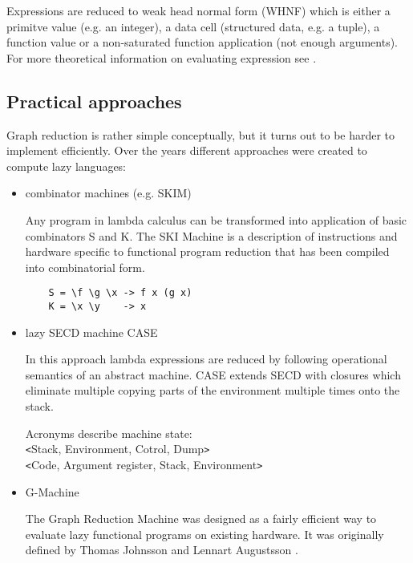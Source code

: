 \documentclass[en]{pracamgr}
\begin{document}
Expressions are reduced to weak head normal form (WHNF)
which is either a primitve value (e.g. an integer),
a data cell (structured data, e.g. a tuple), a function
value or a non-saturated function application (not enough arguments).
For more theoretical information on evaluating expression see \cite{spj-book}.

\subsection{Practical approaches}

Graph reduction is rather simple conceptually, but it turns
out to be harder to implement efficiently. Over the
years different approaches were created to compute lazy languages: 

\newpage
\begin{itemize}
    \item combinator machines (e.g. SKIM) \cite{combinators, SKIM}

        Any program in lambda calculus can be transformed into application
        of basic combinators S and K. The SKI Machine is a description
        of instructions and hardware specific to functional program
        reduction that has been compiled into combinatorial form.

        \begin{verbatim}
    S = \f \g \x -> f x (g x)
    K = \x \y    -> x\end{verbatim}

    \item lazy SECD machine CASE \cite{SECDM,CASE}
    
        In this approach lambda expressions are reduced by following
        operational semantics of an abstract machine. CASE extends SECD
        with closures which eliminate multiple copying parts of the environment
        multiple times onto the stack.
        
        Acronyms describe machine state: \\
        \texttt<Stack, Environment, Cotrol, Dump\texttt> \\
        \texttt<Code, Argument register, Stack, Environment\texttt>
    
    \item G-Machine \cite{G-Machine,spj-book}
    
        The Graph Reduction Machine was designed as a fairly efficient
        way to evaluate lazy functional programs on existing
        hardware. It was originally defined by Thomas Johnsson and Lennart
        Augustsson \cite{G-Machine0}.


\end{itemize}
\end{document}
